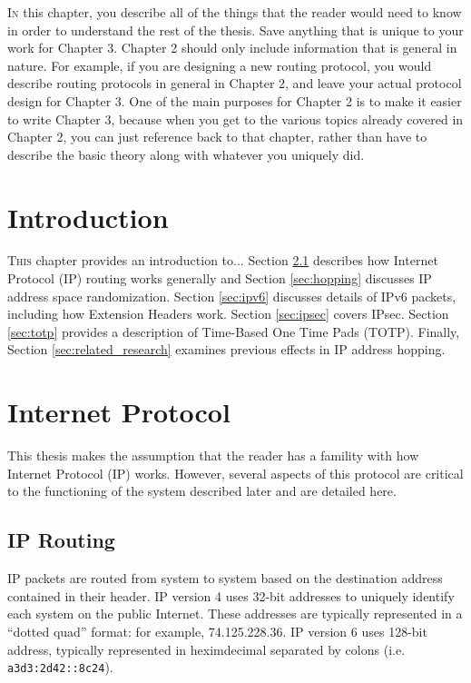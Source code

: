 \lettrine{I}{n} this chapter, you describe all of the things that the reader would need to know in
order to understand the rest of the thesis. Save anything that is unique to your work
for Chapter 3. Chapter 2 should only include information that is general in nature.
For example, if you are designing a new routing protocol, you would describe routing
protocols in general in Chapter 2, and leave your actual protocol design for Chapter 3.
One of the main purposes for Chapter 2 is to make it easier to write Chapter 3,
because when you get to the various topics already covered in Chapter 2, you can just
reference back to that chapter, rather than have to describe the basic theory along with
whatever you uniquely did.

\section{Introduction}
\lettrine{T}{his} chapter provides an introduction to... Section \ref{sec:routing} describes how Internet Protocol (IP) routing works generally and Section \ref{sec:hopping} discusses IP address space randomization. Section \ref{sec:ipv6} discusses details of IPv6 packets, including how Extension Headers work. Section \ref{sec:ipsec} covers IPsec. %
Section \ref{sec:totp} provides a description of Time-Based One Time Pads (TOTP). Finally, Section \ref{sec:related_research} examines previous effects in IP address hopping.

\section{Internet Protocol}
\par This thesis makes the assumption that the reader has a famility with how Internet Protocol (IP) works. However, several aspects of this protocol are critical to the functioning of the system described later and are detailed here. 

\subsection{IP Routing}
\label{sec:routing}
\par IP packets are routed from system to system based on the destination address contained in their header. IP version 4 uses 32-bit addresses to uniquely identify each system on the public Internet. These addresses are typically represented in a ``dotted quad'' format: for example, 74.125.228.36. IP version 6 uses 128-bit address, typically represented in heximdecimal separated by colons (i.e. \texttt{a3d3:2d42::8c24}).

